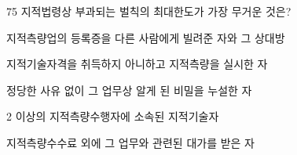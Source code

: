 \begin{question}{75}
지적법령상 부과되는 벌칙의 최대한도가 가장 무거운 것은?
\begin{choices}
  \item 지적측량업의 등록증을 다른 사람에게 빌려준 자와 그 상대방
  \item 지적기술자격을 취득하지 아니하고 지적측량을 실시한 자
  \item 정당한 사유 없이 그 업무상 알게 된 비밀을 누설한 자
  \item 2 이상의 지적측량수행자에 소속된 지적기술자
  \item 지적측량수수료 외에 그 업무와 관련된 대가를 받은 자
\end{choices}
\end{question}
